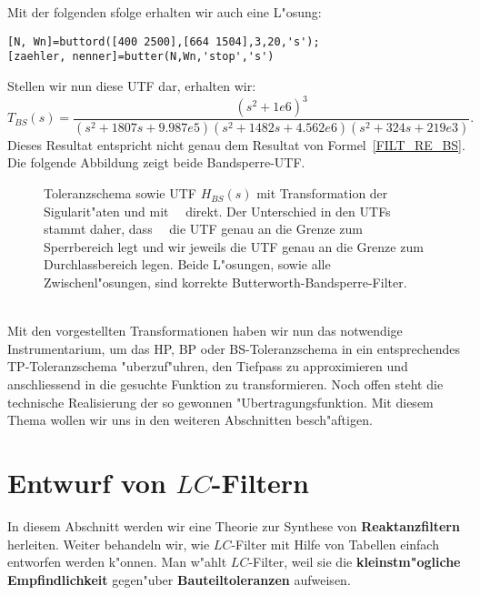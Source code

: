 Mit der folgenden \mb\!\!sfolge erhalten wir auch eine L"osung:
\begin{verbatim}
[N, Wn]=buttord([400 2500],[664 1504],3,20,'s');
[zaehler, nenner]=butter(N,Wn,'stop','s')
\end{verbatim}
Stellen wir nun diese UTF dar, erhalten wir:
\[
T_{BS}(s)=\frac{(s^{2}+1e6)^{3}}{(s^{2}+1807s+9.987e5)(s^{2}+1482s+4.562e6)
(s^{2}+324s+219e3)}.
\]
Dieses Resultat entspricht nicht genau dem Resultat von Formel~\ref{FILT_RE_BS}. Die folgende Abbildung zeigt beide Bandsperre-UTF.
\begin{figure}[!htb]
\vspace*{-3mm}\begin{center}
  \vspace*{-7mm}\caption{Toleranzschema sowie UTF $H_{BS}(s)$ mit Transformation der Sigularit"aten und mit \matlogo~~direkt. Der Unterschied in den UTFs stammt daher, dass \matlogo~~die UTF genau an die Grenze zum Sperrbereich legt und wir jeweils die UTF genau an die Grenze zum Durchlassbereich legen. Beide L"osungen, sowie alle Zwischenl"osungen, sind korrekte Butterworth-Bandsperre-Filter.}
\end{center}
\vspace*{-6mm}
\end{figure}\\

\nit Mit den vorgestellten Transformationen haben wir nun das notwendige
Instrumentarium, um das HP, BP oder BS-Toleranzschema in ein
entsprechendes TP-Toleranzschema
"uberzuf"uhren, den Tiefpass zu approximieren und anschliessend in die
gesuchte Funktion zu transformieren.  Noch offen steht die technische
Realisierung der so gewonnen "Ubertragungsfunktion. Mit diesem Thema
wollen wir uns in den weiteren Abschnitten besch"aftigen.


\clearpage
\section{Entwurf von {\boldmath$LC$}-Filtern}
In diesem Abschnitt werden wir eine Theorie zur
Synthese von
{\bf Reaktanzfiltern}
herleiten. Weiter behandeln wir, wie $LC$-Filter mit Hilfe von Tabellen
einfach entworfen werden k"onnen. Man w"ahlt $LC$-Filter, weil sie die
{\bf kleinstm"ogliche Empfindlichkeit} gegen"uber {\bf Bauteiltoleranzen}
aufweisen.
